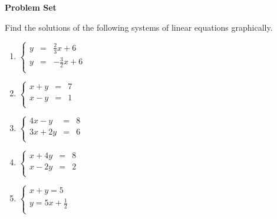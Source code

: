 \textbf{Problem Set}

\vspce

Find the solutions of the following systems of linear equations graphically.

\begin{enumerate}[label = \arabic*. ]

\item \hspce $%
\left\{
\begin{array}{ccl}
y & = & \displaystyle  \frac{2}{3}x+6 \\
y & = & \displaystyle  -\frac{3}{2}x+6 \\
\end{array}
\right. $
\vspce 
\item \hspce $%
\left\{
\begin{array}{ccl}
x+y & = & 7 \\
x-y & = & 1 \\
\end{array}
\right. $
\vspce 
\item \hspce $%
\left\{
\begin{array}{ccl}
4x-y & = & 8 \\
3x+2y & = & 6 \\
\end{array}
\right. $
\vspce 
\item \hspce $%
\left\{
\begin{array}{ccl}
x+4y & = & 8 \\
x-2y & = & 2 \\
\end{array}
\right. 
$
\vspce 
\item \hspce $%
\left\{
\begin{array}{l}
x+y  =  5 \\
y  = 5x+\displaystyle  \frac{1}{2} \\
\end{array}
\right. $

\end{enumerate}  
